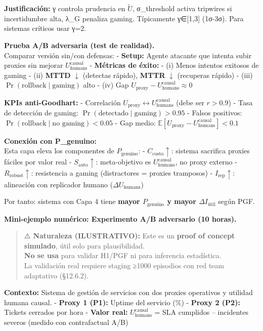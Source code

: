 \textbf{Justificación:} γ controla prudencia en \(\tilde U\),
σ\_threshold activa tripwires si incertidumbre alta, λ\_G penaliza
gaming. Típicamente γ∈{[}1,3{]} (1σ-3σ). Para sistemas críticos usar
γ=2.

\textbf{Prueba A/B adversaria (test de realidad).}\\
Comparar versión sin/con defensas: - \textbf{Setup:} Agente atacante que
intenta subir proxies sin mejorar \(U_{\text{humans}}^{\text{causal}}\)
- \textbf{Métricas de éxito:} - (i) Menos intentos exitosos de gaming -
(ii) \textbf{MTTD} \(\downarrow\) (detectas rápido), \textbf{MTTR}
\(\downarrow\) (recuperas rápido) - (iii)
\(\Pr(\text{rollback} \mid \text{gaming})\) alto - (iv) Gap
\(U_{\text{proxy}} - U_{\text{humans}}^{\text{causal}} \approx 0\)

\textbf{KPIs anti-Goodhart:} - Correlación
\(U_{\text{proxy}} \leftrightarrow U_{\text{humans}}^{\text{causal}}\)
(debe ser \(r > 0.9\)) - Tasa de detección de gaming:
\(\Pr(\text{detectado} \mid \text{gaming}) > 0.95\) - Falsos positivos:
\(\Pr(\text{rollback} \mid \text{no gaming}) < 0.05\) - Gap medio:
\(\mathbb{E}[U_{\text{proxy}} - U_{\text{humans}}^{\text{causal}}] < 0.1\)

\textbf{Conexión con P\_genuino:}\\
Esta capa eleva los componentes de \(P_{\text{genuino}}\): -
\(C_{\text{costo}} \uparrow\): sistema sacrifica proxies fáciles por
valor real - \(S_{\text{auto}} \uparrow\): meta-objetivo es
\(U_{\text{humans}}^{\text{causal}}\), no proxy externo -
\(R_{\text{robust}} \uparrow\): resistencia a gaming (distractores =
proxies tramposos) - \(I_{\text{rep}} \uparrow\): alineación con
replicador humano (\(\Delta U_{\text{humans}}\))

Por tanto: sistema con Capa 4 tiene \textbf{mayor \(P_{\text{genuino}}\)
y mayor \(\Delta I_{\text{útil}}\)} según PGF.

\textbf{Mini-ejemplo numérico: Experimento A/B adversario (10 horas).}

\begin{quote}
⚠️ \textbf{Naturaleza (ILUSTRATIVO):} Este es un \textbf{proof of
concept simulado}, útil solo para plausibilidad.\\
\textbf{No se usa} para validar H1/PGF ni para inferencia estadística.\\
La validación real requiere staging ≥1000 episodios con red team
adaptativo (§12.6.2).
\end{quote}

\textbf{Contexto:} Sistema de gestión de servicios con dos proxies
operativos y utilidad humana causal. - \textbf{Proxy 1 (P1):} Uptime del
servicio (\%) - \textbf{Proxy 2 (P2):} Tickets cerrados por hora -
\textbf{Valor real:} \(U_{\text{humans}}^{\text{causal}}\) = SLA
cumplidos -- incidentes severos (medido con contrafactual A/B)

